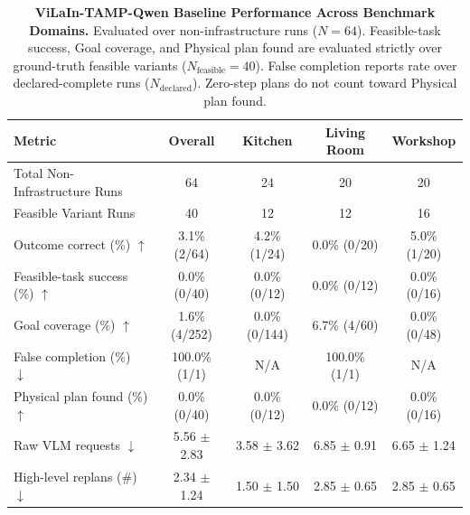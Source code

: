 \begin{table}[t]
\centering
\small
\caption{\textbf{ViLaIn-TAMP-Qwen Baseline Performance Across Benchmark Domains.}
Evaluated over non-infrastructure runs ($N=64$).
Feasible-task success, Goal coverage, and Physical plan found are evaluated strictly over ground-truth feasible variants ($N_{\text{feasible}}=40$).
False completion reports rate over declared-complete runs ($N_{\text{declared}}$). Zero-step plans do not count toward Physical plan found.}
\label{tab:vilain_qwen_main}
\begin{tabular}{l|c|ccc}
\hline
\textbf{Metric} & \textbf{Overall} & \textbf{Kitchen} & \textbf{Living Room} & \textbf{Workshop} \\
\hline
Total Non-Infrastructure Runs & 64 & 24 & 20 & 20 \\
Feasible Variant Runs & 40 & 12 & 12 & 16 \\
\hline
Outcome correct (\%) $\uparrow$ & 3.1\% (2/64) & 4.2\% (1/24) & 0.0\% (0/20) & 5.0\% (1/20) \\
Feasible-task success (\%) $\uparrow$ & 0.0\% (0/40) & 0.0\% (0/12) & 0.0\% (0/12) & 0.0\% (0/16) \\
Goal coverage (\%) $\uparrow$ & 1.6\% (4/252) & 0.0\% (0/144) & 6.7\% (4/60) & 0.0\% (0/48) \\
False completion (\%) $\downarrow$ & 100.0\% (1/1) & N/A & 100.0\% (1/1) & N/A \\
Physical plan found (\%) $\uparrow$ & 0.0\% (0/40) & 0.0\% (0/12) & 0.0\% (0/12) & 0.0\% (0/16) \\
Raw VLM requests $\downarrow$ & 5.56 $\pm$ 2.83 & 3.58 $\pm$ 3.62 & 6.85 $\pm$ 0.91 & 6.65 $\pm$ 1.24 \\
High-level replans (\#) $\downarrow$ & 2.34 $\pm$ 1.24 & 1.50 $\pm$ 1.50 & 2.85 $\pm$ 0.65 & 2.85 $\pm$ 0.65 \\
\hline
\end{tabular}
\end{table}
